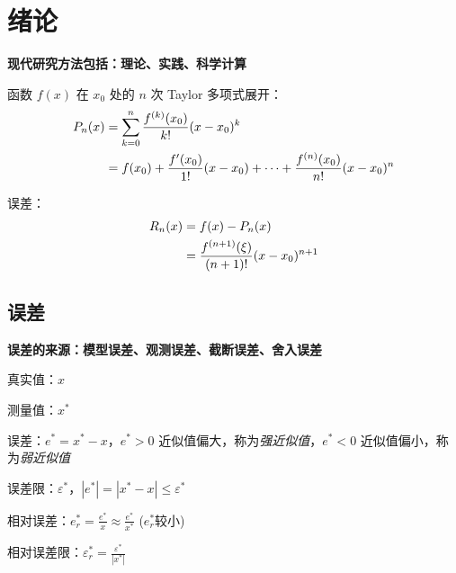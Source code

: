 




% 
\chapter{绪论}

	\textbf{现代研究方法包括：理论、实践、科学计算}

	函数 $f(x)$ 在 $x_0$ 处的 $n$ 次 Taylor 多项式展开：
	\begin{align}
	P_{n}(x) &= \sum_{k=0}^n \frac{f^{(k)}(x_0)}{k!} (x-x_0)^k \notag \\
	&= f(x_{0}) + \frac{f^{\prime}(x_0)}{1!}(x-x_0)+\dots + \frac{f^{(n)}(x_0)}{n!}(x-x_0)^n
	\end{align}

	误差：
	\begin{align}
	R_n(x) &= f(x) - P_n(x) \notag \\
	&= \frac{f^{(n+1)}(\xi)}{(n+1)!} (x-x_0)^{n+1}
	\end{align}


\section{误差}
	\textbf{误差的来源：模型误差、观测误差、截断误差、舍入误差}
	
	真实值：$x$ 
	
	测量值：$x^*$
	
	误差：$e^* = x^* - x$，$e^* > 0$ 近似值偏大，称为{\em 强近似值}，$e^* < 0$ 近似值偏小，称为{\em 弱近似值}
	
	误差限：$\varepsilon^*$，$\left| e^*\right| = \left| x^* - x\right| \le \varepsilon^*$
	
	\begin{spacing}{2.0}
	相对误差：$e^*_r = \displaystyle{\frac{e^*}{x}\approx \frac{e^*}{x^*}}$ ($e_r^*$较小)
	
	相对误差限：$\varepsilon^*_r = \displaystyle{\frac{\varepsilon^*}{\left| x^* \right|}}$
	\end{spacing}\newpage
	
